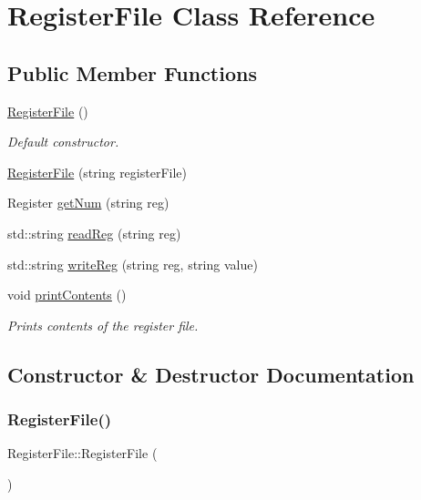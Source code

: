 \hypertarget{class_register_file}{}\section{Register\+File Class Reference}
\label{class_register_file}
\subsection*{Public Member Functions}
\begin{DoxyCompactItemize}
\item 
\mbox{\hyperlink{class_register_file_a9513989ee395d14943de66f99ec8014a}{Register\+File}} ()
\begin{DoxyCompactList}\small\item\em Default constructor. \end{DoxyCompactList}\item 
\mbox{\hyperlink{class_register_file_a9085db6aaabf8e55819d8bbd73f521b4}{Register\+File}} (string register\+File)
\item 
Register \mbox{\hyperlink{class_register_file_a54d87ad82368cfa1dfb8b3f01a3d2e5a}{get\+Num}} (string reg)
\item 
std\+::string \mbox{\hyperlink{class_register_file_a5554dd7d1b78c4a59b23036e9aa66136}{read\+Reg}} (string reg)
\item 
std\+::string \mbox{\hyperlink{class_register_file_a4e4802bee78d7c7173c829764babca9c}{write\+Reg}} (string reg, string value)
\item 
void \mbox{\hyperlink{class_register_file_ac72ef70e7bdee7b5ac7afbfdcd6d8ab1}{print\+Contents}} ()
\begin{DoxyCompactList}\small\item\em Prints contents of the register file. \end{DoxyCompactList}\end{DoxyCompactItemize}


\subsection{Constructor \& Destructor Documentation}
\mbox{\label{class_register_file_a9513989ee395d14943de66f99ec8014a}} 
\subsubsection{\texorpdfstring{Register\+File()}{RegisterFile()}\hspace{0.1cm}{\footnotesize\ttfamily [1/2]}}
{\footnotesize\ttfamily Register\+File\+::\+Register\+File (\begin{DoxyParamCaption}{ }\end{DoxyParamCaption})}




